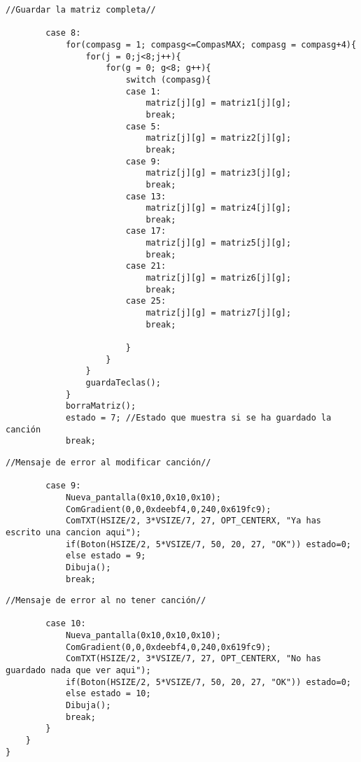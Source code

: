 \documentclass[12pt,a4paper]{article}
\begin{document}
\begin{lstlisting}[basicstyle=\footnotesize] 
            //Guardar la matriz completa//

        case 8:
            for(compasg = 1; compasg<=CompasMAX; compasg = compasg+4){
                for(j = 0;j<8;j++){
                    for(g = 0; g<8; g++){
                        switch (compasg){
                        case 1:
                            matriz[j][g] = matriz1[j][g];
                            break;
                        case 5:
                            matriz[j][g] = matriz2[j][g];
                            break;
                        case 9:
                            matriz[j][g] = matriz3[j][g];
                            break;
                        case 13:
                            matriz[j][g] = matriz4[j][g];
                            break;
                        case 17:
                            matriz[j][g] = matriz5[j][g];
                            break;
                        case 21:
                            matriz[j][g] = matriz6[j][g];
                            break;
                        case 25:
                            matriz[j][g] = matriz7[j][g];
                            break;

                        }
                    }
                }
                guardaTeclas();
            }
            borraMatriz();
            estado = 7; //Estado que muestra si se ha guardado la canción
            break;
\end{lstlisting}

\begin{lstlisting}[basicstyle=\footnotesize]
            //Mensaje de error al modificar canción//

        case 9:
            Nueva_pantalla(0x10,0x10,0x10);
            ComGradient(0,0,0xdeebf4,0,240,0x619fc9);
            ComTXT(HSIZE/2, 3*VSIZE/7, 27, OPT_CENTERX, "Ya has escrito una cancion aqui");
            if(Boton(HSIZE/2, 5*VSIZE/7, 50, 20, 27, "OK")) estado=0;
            else estado = 9;
            Dibuja();
            break;
\end{lstlisting}

\begin{lstlisting}[basicstyle=\footnotesize]
            //Mensaje de error al no tener canción//

        case 10:
            Nueva_pantalla(0x10,0x10,0x10);
            ComGradient(0,0,0xdeebf4,0,240,0x619fc9);
            ComTXT(HSIZE/2, 3*VSIZE/7, 27, OPT_CENTERX, "No has guardado nada que ver aqui");
            if(Boton(HSIZE/2, 5*VSIZE/7, 50, 20, 27, "OK")) estado=0;
            else estado = 10;
            Dibuja();
            break;
        }
    }
}
\end{lstlisting}
\end{document}
